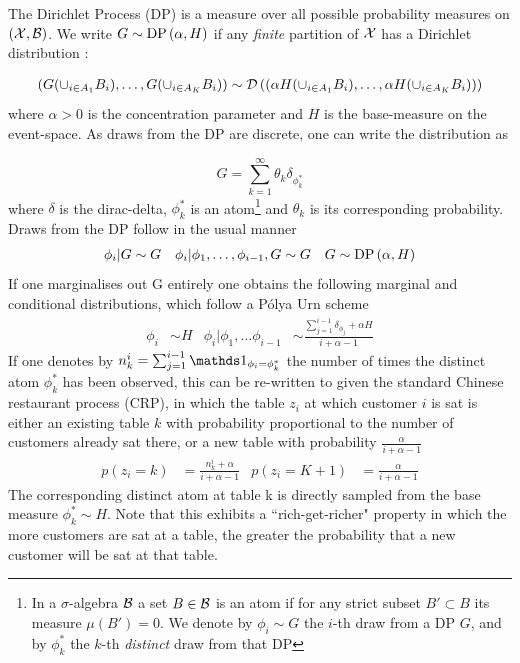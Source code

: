 The Dirichlet Process (DP) is a measure over all possible probability measures on $(\mathcal{X}, \mathcal{B})$. We write $G \sim \text{DP} \left( {\alpha, H} \right)$ if any \emph{finite} partition of $\mathcal{X}$ has a Dirichlet distribution\cite{Ferguson1973} :

\begin{align}
\left(
    G(\cup_{i \in A_1} B_i),
    \ldots,
    G(\cup_{i \in A_K} B_i)
\right)
\sim
\mathcal{D} \left( {
    \left(
        \alpha H(\cup_{i \in A_1} B_i),
        \ldots,
        \alpha H(\cup_{i \in A_K} B_i)
    \right)
} \right)
\end{align}
where $\alpha > 0$ is the concentration parameter and $H$ is the base-measure on the event-space. As draws from the DP are discrete, one can write the distribution as

\begin{equation}
G = \sum_{k=1}^{\infty} \theta_k \delta_{\phi^*_k} \label{eqn:ch1:dp-as-weighted-atoms}
\end{equation}
where $\delta$ is the dirac-delta, $\phi^*_k$ is an atom\footnote{In a $\sigma$-algebra $\mathcal{B}$ a set $B \in \mathcal{B}$ is an atom if for any strict subset $B' \subset B$ its measure $\mu(B') = 0$. We denote by $\phi_i \sim G$ the $i$-th draw from a DP $G$, and by $\phi^*_k$ the $k$-th \emph{distinct} draw from that DP} and $\theta_k$ is its corresponding probability. Draws from the DP follow in the usual manner
\begin{align}
\phi_i|G & \sim G &
\phi_i|\phi_1,\ldots,\phi_{i-1},G & \sim G &
G \sim \text{DP} \left( {\alpha, H} \right)
\end{align}
If one marginalises out G entirely one obtains the following marginal and conditional distributions, which follow a P\'olya Urn scheme\cite{Blackwell1973}
\begin{align}
\phi_i &
\sim H &
\phi_i | \phi_1, \ldots \phi_{i-1} &
\sim \frac{\sum_{j=1}^{i-1} \delta_{\phi_j} + \alpha H}{i + \alpha - 1}
\end{align}
If one denotes by $n^i_k = \sum_{j=1}^{i-1} \one_{\phi_i = \phi^*_k}$ the number of times the distinct atom $\phi^*_k$ has been observed, this can be re-written to given the standard Chinese restaurant process (CRP)\cite{Neal2000}, in which the table $z_i$ at which customer $i$ is sat is either an existing table $k$ with probability proportional to the number of customers already sat there, or a new table with probability $\frac{\alpha}{i + \alpha - 1}$
\begin{align}
p(z_i = k) & = \frac{n^i_k + \alpha}{i + \alpha - 1} &
p(z_i = K + 1) & = \frac{\alpha}{i + \alpha - 1}
\end{align}
The corresponding distinct atom at table k is directly sampled from the base measure $\phi^*_k \sim H$. Note that this exhibits a ``rich-get-richer" property in which the more customers are sat at a table, the greater the probability that a new customer will be sat at that table.

